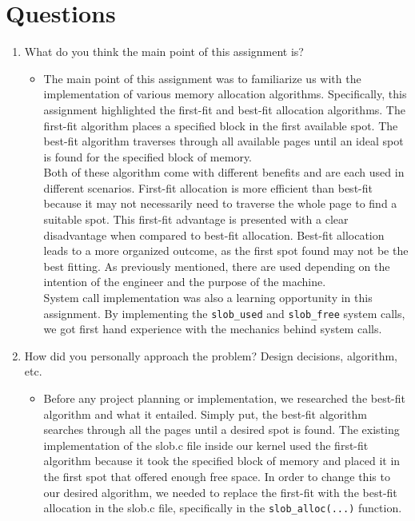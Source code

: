 \documentclass[letterpaper,10pt,onecolumn]{IEEEtran}
\newcommand\tab[1][1cm]{\hspace*{#1}}
\begin{document}
    
    \vspace{6mm}
    
   
    \section*{Questions}
    \begin{enumerate}
        \item What do you think the main point of this assignment is?
        \begin{itemize}
            \item \tab The main point of this assignment was to familiarize us with the implementation of various memory allocation algorithms. Specifically, this assignment highlighted the first-fit and best-fit allocation algorithms. The first-fit algorithm places a specified block in the first available spot. The best-fit algorithm traverses through all available pages until an ideal spot is found for the specified block of memory.\\
            \tab Both of these algorithm come with different benefits and are each used in different scenarios. First-fit allocation is more efficient than best-fit because it may not necessarily need to traverse the whole page to find a suitable spot. This first-fit advantage is presented with a clear disadvantage when compared to best-fit allocation. Best-fit allocation leads to a more organized outcome, as the first spot found may not be the best fitting. As previously mentioned, there are used depending on the intention of the engineer and the purpose of the machine.\\
            \tab System call implementation was also a learning opportunity in this assignment. By implementing the \texttt{slob\_used} and \texttt{slob\_free} system calls, we got first hand experience with the mechanics behind system calls.
        \end{itemize}
        \item How did you personally approach the problem? Design decisions, algorithm, etc.
        \begin{itemize}
            \item \tab Before any project planning or implementation, we researched the best-fit algorithm and what it entailed. Simply put, the best-fit algorithm searches through all the pages until a desired spot is found. The existing implementation of the slob.c file inside our kernel used the first-fit algorithm because it took the specified block of memory and placed it in the first spot that offered enough free space. In order to change this to our desired algorithm, we needed to replace the first-fit with the best-fit allocation in the slob.c file, specifically in the \texttt{slob\_alloc(...)} function.\\

\end{itemize}
\end{enumerate}
\end{document}
